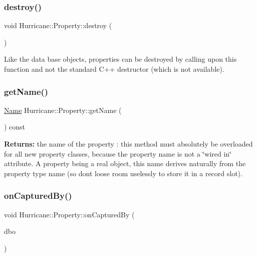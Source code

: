 \subsubsection{\texorpdfstring{destroy()}{destroy()}}
{\footnotesize\ttfamily void Hurricane\+::\+Property\+::destroy (\begin{DoxyParamCaption}{ }\end{DoxyParamCaption})\hspace{0.3cm}{\ttfamily [virtual]}}

Like the data base objects, properties can be destroyed by calling upon this function and not the standard C++ destructor (which is not available). \mbox{\label{classHurricane_1_1Property_a2759e2003c15d417b925092bc253ddd1}} 
\subsubsection{\texorpdfstring{get\+Name()}{getName()}}
{\footnotesize\ttfamily \hyperlink{classHurricane_1_1Name}{Name} Hurricane\+::\+Property\+::get\+Name (\begin{DoxyParamCaption}{ }\end{DoxyParamCaption}) const\hspace{0.3cm}{\ttfamily [pure virtual]}}

{\bfseries Returns\+:} the name of the property \+: this method must absolutely be overloaded for all new property classes, because the property name is not a \char`\"{}wired in\char`\"{} attribute. A property being a real object, this name derives naturally from the property type name (so don\textquotesingle{}t loose room uselessly to store it in a record slot). \mbox{\label{classHurricane_1_1Property_ac7b936414d9d85bb6509100b5dd6a667}} 
\subsubsection{\texorpdfstring{on\+Captured\+By()}{onCapturedBy()}}
{\footnotesize\ttfamily void Hurricane\+::\+Property\+::on\+Captured\+By (\begin{DoxyParamCaption}\item[{\hyperlink{classHurricane_1_1DBo}{D\+Bo} $\ast$}]{dbo }\end{DoxyParamCaption})\hspace{0.3cm}{\ttfamily [pure virtual]}}

